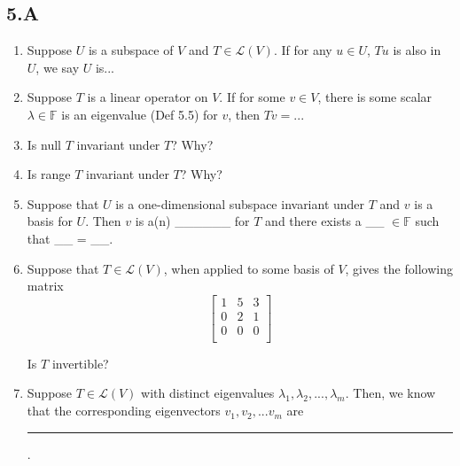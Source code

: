 \documentclass[11pt]{article}
\begin{document}
\subsection*{5.A}
\begin{enumerate}
	\item Suppose $U$ is a subspace of $V$ and $T \in \mathcal{L}(V)$. If for any $u \in U$, $Tu$ is also in $U$, we say $U$ is...
	\item Suppose $T$ is a linear operator on $V$. If for some $v \in V$, there is some scalar $\lambda \in \mathbb{F}$ is an eigenvalue (Def 5.5) for $v$, then $Tv = ...$
	\item Is null $T$ invariant under $T$? Why?
	\item Is range $T$ invariant under $T$? Why?
	\item Suppose that $U$ is a one-dimensional subspace invariant under $T$ and $v$ is a basis for $U$. Then $v$ is a(n) \_\_\_\_\_\_ for $T$ and there exists a \_\_ $\in \mathbb{F}$ such that \_\_ = \_\_.
	\item Suppose that $T \in \mathcal{L}(V)$, when applied to some basis of $V$, gives the following matrix
	\[
	\begin{bmatrix}
		1 & 5 & 3 \\
		0 & 2 & 1 \\
		0 & 0 & 0 \\
	\end{bmatrix}
	\]
	
	Is $T$ invertible?
	\item Suppose $T \in \mathcal{L}(V)$ with distinct eigenvalues $\lambda_1, \lambda_2, ..., \lambda_m$. Then, we know that the corresponding eigenvectors $v_1, v_2, ... v_m$ are \rule[0ex]{2in}{0.5pt}.
\end{enumerate}
\end{document}
